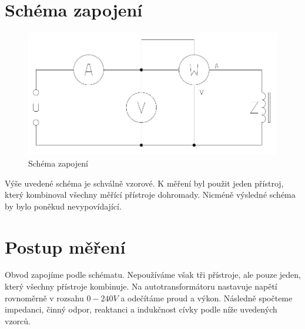\documentclass[12pt]{article} %
\begin{document}
\section{Schéma zapojení}
\begin{figure}[H]
\center
\includegraphics[scale=0.5]{schema.png}
\caption{Schéma zapojení}
\end{figure}
Výše uvedené schéma je schválně vzorové. K měření byl použit jeden přístroj, který kombinoval všechny měřící přístroje dohromady. Nicméně výsledné schéma by bylo poněkud nevypovídající.

\section{Postup měření}
Obvod zapojíme podle schématu. Nepoužíváme však tři přístroje, ale pouze jeden, který všechny přístroje kombinuje. Na autotransformátoru nastavuje napětí rovnoměrně v rozsahu $0-240V$ a odečítáme proud a výkon. Následně spočteme impedanci, činný odpor, reaktanci a indukčnost cívky podle níže uvedených vzorců.
\end{document}
